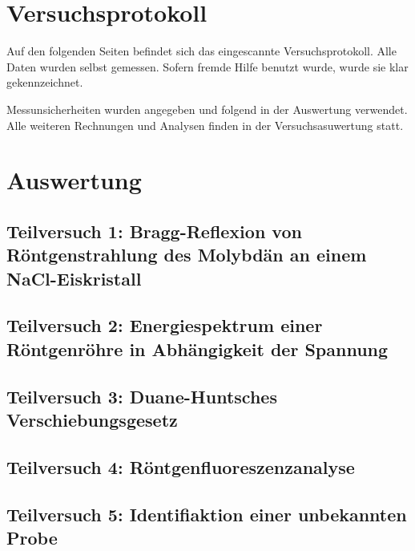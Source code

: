 \documentclass{article}
\begin{document}
\newpage

\iffalse

\section{Versuchsprotokoll}

Auf den folgenden Seiten befindet sich das eingescannte Versuchsprotokoll. Alle Daten wurden selbst gemessen. Sofern fremde Hilfe benutzt wurde, wurde sie klar gekennzeichnet.

Messunsicherheiten wurden angegeben und folgend in der Auswertung verwendet. Alle weiteren Rechnungen und Analysen finden in der Versuchsasuwertung statt.



\newpage

\section{Auswertung}

    \subsection{Teilversuch 1: Bragg-Reflexion von Röntgenstrahlung des Molybdän an einem NaCl-Eiskristall}

    \newpage

    \subsection{Teilversuch 2: Energiespektrum einer Röntgenröhre in Abhängigkeit der Spannung}
    
    \newpage

    \subsection{Teilversuch 3: Duane-Huntsches Verschiebungsgesetz}

    \newpage

    \subsection{Teilversuch 4: Röntgenfluoreszenzanalyse}

    \newpage

    \subsection{Teilversuch 5: Identifiaktion einer unbekannten Probe}
\end{document}
